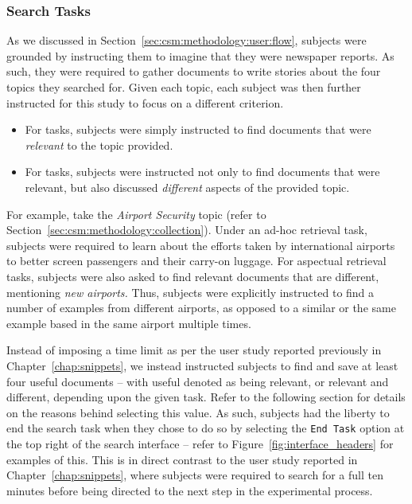 \subsubsection{Search Tasks}\label{sec:diversity:users:method:tasks}
As we discussed in Section~\ref{sec:csm:methodology:user:flow}, subjects were grounded by instructing them to imagine that they were newspaper reports. As such, they were required to gather documents to write stories about the four topics they searched for. Given each topic, each subject was then further instructed for this study to focus on a different criterion.

\begin{itemize}
    \item{For  tasks, subjects were simply instructed to find documents that were \emph{relevant} to the topic provided.}
    \item{For  tasks, subjects were instructed not only to find documents that were relevant, but also discussed \emph{different} aspects of the provided topic.}
\end{itemize}

For example, take the \emph{Airport Security} topic (refer to Section~\ref{sec:csm:methodology:collection}). Under an ad-hoc retrieval task, subjects were required to learn about the efforts taken by international airports to better screen passengers and their carry-on luggage. For aspectual retrieval tasks, subjects were also asked to find relevant documents that are different, mentioning \emph{new airports.} Thus, subjects were explicitly instructed to find a number of examples from different airports, as opposed to a similar or the same example based in the same airport multiple times.

Instead of imposing a time limit as per the user study reported previously in Chapter~\ref{chap:snippets}, we instead instructed subjects to find and save at least four useful documents -- with useful denoted as being relevant, or relevant and different, depending upon the given task. Refer to the following section for details on the reasons behind selecting this value. As such, subjects had the liberty to end the search task when they chose to do so by selecting the \texttt{End Task} option at the top right of the search interface -- refer to Figure~\ref{fig:interface_headers} for examples of this. This is in direct contrast to the user study reported in Chapter~\ref{chap:snippets}, where subjects were required to search for a full ten minutes before being directed to the next step in the experimental process.

